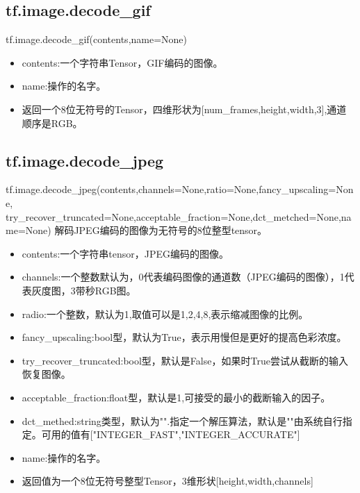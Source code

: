 \subsection{tf.image.decode\_gif}
tf.image.decode\_gif(contents,name=None)
\begin{itemize}
\item contents:一个字符串Tensor，GIF编码的图像。
\item name:操作的名字。
\item 返回一个8位无符号的Tensor，四维形状为[num\_frames,height,width,3],通道顺序是RGB。
\end{itemize}
\subsection{tf.image.decode\_jpeg}
tf.image.decode\_jpeg(contents,channels=None,ratio=None,fancy\_upscaling=None,\newline
try\_recover\_truncated=None,acceptable\_fraction=None,dct\_metched=None,name=None)
解码JPEG编码的图像为无符号的8位整型tensor。\newline
\begin{itemize}
	\item contents:一个字符串tensor，JPEG编码的图像。
	\item channels:一个整数默认为，0代表编码图像的通道数（JPEG编码的图像），1代表灰度图，3带秒RGB图。
	\item radio:一个整数，默认为1,取值可以是1,2,4,8,表示缩减图像的比例。
	\item fancy\_upscaling:bool型，默认为True，表示用慢但是更好的提高色彩浓度。
	\item try\_recover\_truncated:bool型，默认是False，如果时True尝试从截断的输入恢复图像。
	\item acceptable\_fraction:float型，默认是1,可接受的最小的截断输入的因子。
	\item dct\_methed:string类型，默认为"".指定一个解压算法，默认是""由系统自行指定。可用的值有["INTEGER\_FAST","INTEGER\_ACCURATE"]
	\item name:操作的名字。
	\item 返回值为一个8位无符号整型Tensor，3维形状[height,width,channels]
\end{itemize}
